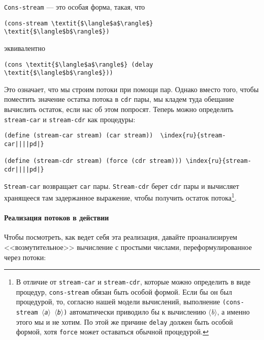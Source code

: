 {\tt Cons-stream}  --- это особая форма, такая, что

\begin{Verbatim}[fontsize=\small]
(cons-stream \textit{$\langle$a$\rangle$} \textit{$\langle$b$\rangle$})
\end{Verbatim}
эквивалентно
\begin{Verbatim}[fontsize=\small]
(cons \textit{$\langle$a$\rangle$} (delay \textit{$\langle$b$\rangle$}))
\end{Verbatim}

Это означает, что мы строим потоки при помощи пар.  Однако
вместо того, чтобы поместить значение остатка потока в {\tt cdr}
пары, мы кладем туда обещание вычислить остаток, если нас об этом
попросят.  Теперь можно определить {\tt stream-car} и
{\tt stream-cdr} как процедуры:

\begin{Verbatim}[fontsize=\small]
(define (stream-car stream) (car stream))  \index{ru}{stream-car||||pd|}

(define (stream-cdr stream) (force (cdr stream))) \index{ru}{stream-cdr||||pd|}
\end{Verbatim}

{\tt Stream-car} возвращает {\tt car}
пары. {\tt Stream-cdr} берет {\tt cdr} пары и вычисляет
хранящееся там задержанное выражение, чтобы получить остаток
потока\footnote{В отличие от {\tt stream-car} и
{\tt stream-cdr}, которые можно определить в виде процедур,
{\tt cons-stream} обязан быть особой формой.
Если бы он был
процедурой, то, согласно нашей модели вычислений, выполнение
{\tt (cons-stream \textit{$\langle$a$\rangle$} \textit{$\langle$b$\rangle$})}
автоматически приводило бы к вычислению \textit{$\langle$b$\rangle$}, а именно
этого мы и не хотим.  По этой же причине {\tt delay} должен
быть особой формой, хотя {\tt force} может оставаться обычной
процедурой.
}.

\paragraph{Реализация потоков в действии}


Чтобы посмотреть, как ведет себя эта реализация, давайте
проанализируем <<возмутительное>> вычисление с простыми числами,
переформулированное через потоки:

